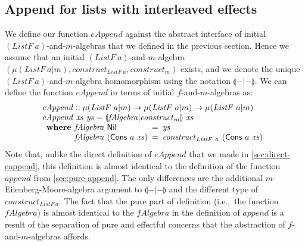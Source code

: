 \documentclass{jfp1}
\newcommand{\eFold}[2]{\llparenthesis #1|#2 \rrparenthesis}
\begin{document}
\subsection{Append for lists with interleaved effects}

We define our function $\mathit{eAppend}$ against the abstract
interface of initial $(\mathit{ListF}~a)$-and-$m$-algebras that we
defined in the previous section. Hence we assume that an initial
$(\mathit{ListF}~a)$-and-$m$-algebra $(\mu(\mathit{ListF}~a|m),
\mathit{construct}_{\mathit{ListF}~a}, \mathit{construct}_m)$ exists,
and we denote the unique $(\mathit{ListF}~a)$-and-$m$-algebra
homomorphism using the notation $\eFold{-}{-}$. We can define the
function $\mathit{eAppend}$ in terms of initial $f$-and-$m$-algebras
as:
\begin{displaymath}
  \begin{array}{l}
    \mathit{eAppend} :: \mu(\mathit{ListF}~a|m) \to \mu(\mathit{ListF}~a|m) \to \mu(\mathit{ListF}~a|m) \\
    \mathit{eAppend}~\mathit{xs}~\mathit{ys} = \eFold{\mathit{fAlgebra}}{\mathit{construct}_m}~\mathit{xs} \\
    \begin{array}{r@{\hspace{0.4em}}l@{\hspace{0.5em}}c@{\hspace{0.5em}}l}
      \textbf{where} & \mathit{fAlgebra}~\mathsf{Nil} &=& \mathit{ys} \\
                     & \mathit{fAlgebra}~(\mathsf{Cons}~a~\mathit{xs}) &=& \mathit{construct}_{\mathit{ListF}~a}~(\mathsf{Cons}~a~\mathit{xs})      
    \end{array}
  \end{array}
\end{displaymath}
Note that, unlike the direct definition of $\mathit{eAppend}$ that we
made in \autoref{sec:direct-eappend}, this definition is almost
identical to the definition of the function $\mathit{append}$ from
\autoref{sec:pure-append}. The only differences are the additional
$m$-Eilenberg-Moore-algebra argument to $\eFold{-}{-}$ and the
different type of $\mathit{construct}_{\mathit{ListF}~a}$. The fact
that the pure part of definition (i.e.,~the function
$\mathit{fAlgebra}$) is almost identical to the $\mathit{fAlgebra}$ in
the definition of $\mathit{append}$ is a result of the separation of
pure and effectful concerns that the abstraction of
$f$-and-$m$-algebras affords.
\end{document}
